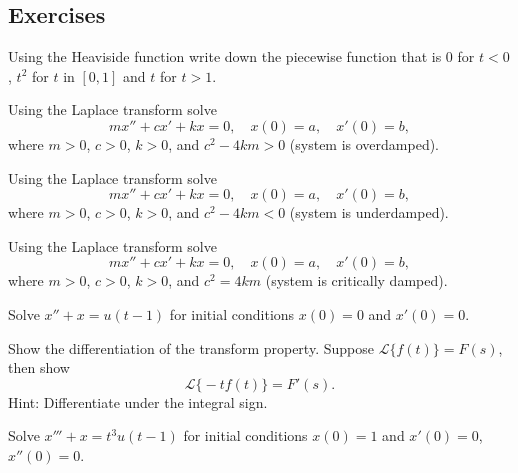 \subsection{Exercises}

\begin{exercise}
Using the Heaviside function write down the piecewise function
that is 0 for $t < 0$, $t^2$ for $t$ in $[0,1]$ and $t$ for $t > 1$.
\end{exercise}

\begin{exercise}
Using the Laplace transform solve
\begin{equation*}
m x'' + c x' + k x = 0 , \quad x(0) = a, \quad x'(0) = b ,
\end{equation*}
where $m > 0$, $c > 0$, $k > 0$, and
$c^2 - 4km > 0$ (system is overdamped).
\end{exercise}

\begin{exercise}
Using the Laplace transform solve
\begin{equation*}
m x'' + c x' + k x = 0 , \quad x(0) = a, \quad x'(0) = b ,
\end{equation*}
where $m > 0$, $c > 0$, $k > 0$, and
$c^2 - 4km < 0$ (system is underdamped).
\end{exercise}

\begin{exercise}
Using the Laplace transform solve
\begin{equation*}
m x'' + c x' + k x = 0 , \quad x(0) = a, \quad x'(0) = b ,
\end{equation*}
where $m > 0$, $c > 0$, $k > 0$, and
$c^2 = 4km$ (system is critically damped).
\end{exercise}

\begin{exercise}
Solve $x'' + x = u(t-1)$ for initial conditions $x(0) = 0$ and $x'(0) = 0$.
\end{exercise}

\begin{exercise}
Show the differentiation of the transform property.  Suppose
$\mathcal{L} \bigl\{ f(t) \bigr\} = F(s)$, then show
\begin{equation*}
\mathcal{L} \bigl\{ -t f(t) \bigr\} = F'(s) .
\end{equation*}
Hint: Differentiate under the integral sign.
\end{exercise}

\begin{exercise}
Solve $x''' + x = t^3 u(t-1)$ for initial conditions $x(0) = 1$ and $x'(0) =
0$, $x''(0) = 0$.
\end{exercise}

